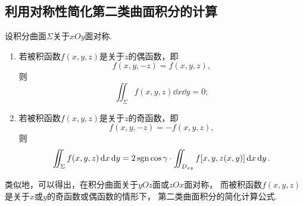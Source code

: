 \subsection{利用对称性简化第二类曲面积分的计算}
设积分曲面\(\Sigma\)关于\(xOy\)面对称.
\begin{enumerate}
	\item 若被积函数\(f(x,y,z)\)是关于\(z\)的偶函数，即\[
		f(x,y,-z) = f(x,y,z),
	\]
	则\[
		\iint_\Sigma f(x,y,z) \dd{x}\dd{y} = 0;
	\]

	\item 若被积函数\(f(x,y,z)\)是关于\(z\)的奇函数，即\[
		f(x,y,-z) = -f(x,y,z),
	\]
	则\[
		\iint_\Sigma f(x,y,z) \dd{x}\dd{y}
		= 2 \operatorname{sgn}\cos\gamma \cdot \iint_{D_{xy}} f[x,y,z(x,y)] \dd{x}\dd{y}.
	\]
\end{enumerate}

类似地，可以得出，在积分曲面关于\(yOz\)面或\(zOx\)面对称，
而被积函数\(f(x,y,z)\)是关于\(x\)或\(y\)的奇函数或偶函数的情形下，
第二类曲面积分的简化计算公式.
